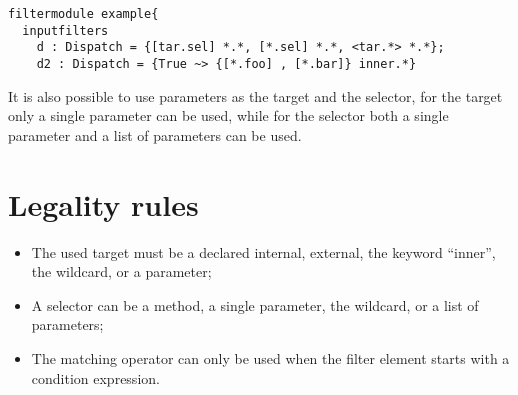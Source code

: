 \begin{lstlisting}[caption={Some possible matching parts},label=lst::ARM:ARMMP:example1,
style=listing,language =ComposeStar,float=tpb]
filtermodule example{
  inputfilters
    d : Dispatch = {[tar.sel] *.*, [*.sel] *.*, <tar.*> *.*};
    d2 : Dispatch = {True ~> {[*.foo] , [*.bar]} inner.*}
\end{lstlisting}

It is also possible to use parameters as the target and the selector, for the target only a single parameter can be used, while for the selector both a single parameter and a list of parameters can be used.

\section{Legality rules}
\begin{itemize}[noitemsep]
\item The used target must be a declared internal, external, the keyword ``inner'', the wildcard, or a parameter;
\item A selector can be a method, a single parameter, the wildcard, or a list of parameters;
\item The matching operator can only be used when the filter element starts with a condition expression.
\end{itemize}


\comments{}
